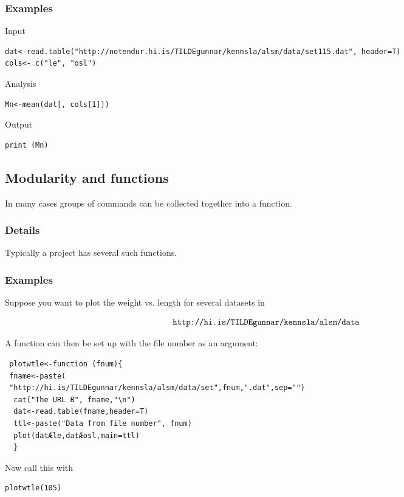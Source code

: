 \documentclass[12pt,a4paper]{article}
\theoremstyle{regla}
\theoremstyle{remark}
\theoremstyle{definition}
\theoremstyle{nonumberbreak}
\begin{document}
\subsubsection{Examples}
\begin{xmpl}
Input
\begin{lstlisting}
dat<-read.table("http://notendur.hi.is/TILDEgunnar/kennsla/alsm/data/set115.dat", header=T)
cols<- c("le", "osl")
\end{lstlisting}

Analysis
\begin{lstlisting}
Mn<-mean(dat[, cols[1]])
\end{lstlisting}


Output
\begin{lstlisting}
print (Mn)
\end{lstlisting}
\end{xmpl}

\subsection{Modularity and functions}
\begin{fbox}
\begin{minipage}{0.97\textwidth}
In many cases groups of commands can be collected together into a function. 
\end{minipage}
\end{fbox}
\subsubsection{Details}
Typically a project has several such functions.
\subsubsection{Examples}
\begin{xmpl}

Suppose you want to plot the weight vs. length for several datasets in

$$\verb|http://hi.is/TILDEgunnar/kennsla/alsm/data|$$

A function can then be set up with the file number as an argument:
\begin{lstlisting}
 plotwtle<-function (fnum){
 fname<-paste(
 "http://hi.is/TILDEgunnar/kennsla/alsm/data/set",fnum,".dat",sep="")
  cat("The URL B", fname,"\n")
  dat<-read.table(fname,header=T)
  ttl<-paste("Data from file number", fnum)
  plot(datÆle,datÆosl,main=ttl)
  }
\end{lstlisting}

Now call this with
\begin{lstlisting}
plotwtle(105)
\end{lstlisting}
\end{xmpl}
\end{document}
